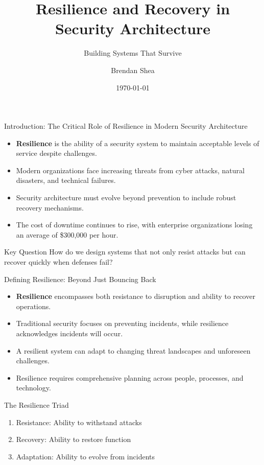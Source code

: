 \documentclass{beamer}
\title{Resilience and Recovery in Security Architecture}
\subtitle{Building Systems That Survive}
\author{Brendan Shea}
\date{\today}
\begin{document}
\begin{frame}
    \titlepage
\end{frame}

\begin{frame}{Introduction: The Critical Role of Resilience in Modern Security Architecture}
    \begin{itemize}
        \item \textbf{Resilience} is the ability of a security system to maintain acceptable levels of service despite challenges.
        \item Modern organizations face increasing threats from cyber attacks, natural disasters, and technical failures.
        \item Security architecture must evolve beyond prevention to include robust recovery mechanisms.
        \item The cost of downtime continues to rise, with enterprise organizations losing an average of \$300,000 per hour.
    \end{itemize}
    
    \begin{alertblock}{Key Question}
        How do we design systems that not only resist attacks but can recover quickly when defenses fail?
    \end{alertblock}
\end{frame}

\begin{frame}{Defining Resilience: Beyond Just Bouncing Back}
    \begin{itemize}
        \item \textbf{Resilience} encompasses both resistance to disruption and ability to recover operations.
        \item Traditional security focuses on preventing incidents, while resilience acknowledges incidents will occur.
        \item A resilient system can adapt to changing threat landscapes and unforeseen challenges.
        \item Resilience requires comprehensive planning across people, processes, and technology.
    \end{itemize}
    
    \begin{block}{The Resilience Triad}
        \begin{enumerate}
            \item Resistance: Ability to withstand attacks
            \item Recovery: Ability to restore function
            \item Adaptation: Ability to evolve from incidents
        \end{enumerate}
    \end{block}
\end{frame}
\end{document}
